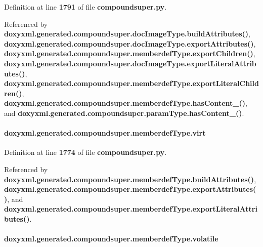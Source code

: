 Definition at line {\bf 1791} of file {\bf compoundsuper.\+py}.



Referenced by {\bf doxyxml.\+generated.\+compoundsuper.\+doc\+Image\+Type.\+build\+Attributes()}, {\bf doxyxml.\+generated.\+compoundsuper.\+doc\+Image\+Type.\+export\+Attributes()}, {\bf doxyxml.\+generated.\+compoundsuper.\+memberdef\+Type.\+export\+Children()}, {\bf doxyxml.\+generated.\+compoundsuper.\+doc\+Image\+Type.\+export\+Literal\+Attributes()}, {\bf doxyxml.\+generated.\+compoundsuper.\+memberdef\+Type.\+export\+Literal\+Children()}, {\bf doxyxml.\+generated.\+compoundsuper.\+memberdef\+Type.\+has\+Content\+\_\+()}, and {\bf doxyxml.\+generated.\+compoundsuper.\+param\+Type.\+has\+Content\+\_\+()}.

\paragraph[{virt}]{\setlength{\rightskip}{0pt plus 5cm}doxyxml.\+generated.\+compoundsuper.\+memberdef\+Type.\+virt}\label{classdoxyxml_1_1generated_1_1compoundsuper_1_1memberdefType_a7d74eed4580c48963bb4f847461f20c4}


Definition at line {\bf 1774} of file {\bf compoundsuper.\+py}.



Referenced by {\bf doxyxml.\+generated.\+compoundsuper.\+memberdef\+Type.\+build\+Attributes()}, {\bf doxyxml.\+generated.\+compoundsuper.\+memberdef\+Type.\+export\+Attributes()}, and {\bf doxyxml.\+generated.\+compoundsuper.\+memberdef\+Type.\+export\+Literal\+Attributes()}.

\paragraph[{volatile}]{\setlength{\rightskip}{0pt plus 5cm}doxyxml.\+generated.\+compoundsuper.\+memberdef\+Type.\+volatile}\label{classdoxyxml_1_1generated_1_1compoundsuper_1_1memberdefType_a707199edeb42cfe331dacfa358ec7cbd}


